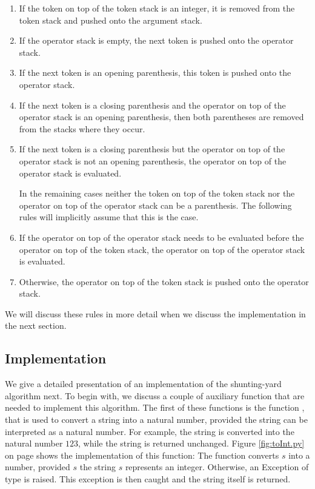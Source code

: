 \begin{enumerate}
\item If the token on top of the token stack is an integer, it is removed from the token stack and pushed onto
      the argument stack.
\item If the operator stack is empty, the next token is pushed onto the operator stack.
\item If the next token is an opening parenthesis, this token is pushed onto the operator stack.
\item If the next token is a closing parenthesis and the operator on top of the operator stack is an opening
      parenthesis, then both parentheses are removed from the stacks where they occur.
\item If the next token is a closing parenthesis but the operator on top of the operator stack is not an
      opening parenthesis,  the operator on top of the operator stack is evaluated.
 
      In the remaining cases neither the token on top of the token stack nor the operator on top of the
      operator stack can be a parenthesis.  The following rules will implicitly assume that this is the case.
\item If the operator on top of the operator stack needs to be evaluated before the operator on top of the token stack,
      the operator on top of the operator stack is evaluated.
\item Otherwise, the operator on top of the token stack is pushed onto the operator stack.
\end{enumerate}
We will discuss these rules in more detail when we discuss the implementation in the next section.


\subsection{Implementation}
We give a detailed presentation of an implementation of the shunting-yard algorithm next.  To begin with, we
discuss a couple of auxiliary 
function that are needed to implement this algorithm.  The first of these functions is the function
, that is used to convert a string into a natural number, provided the string can be interpreted as a
natural number.  For example, the string  is converted into the natural number $123$, while the
string  is returned unchanged.  Figure \ref{fig:toInt.py} on page \pageref{fig:toInt.py} shows the
implementation of this function:  The function  converts $s$ into a number, provided $s$ the string
$s$ represents an integer.  Otherwise, an Exception of type  is raised.  This exception is
then caught and the string itself is returned.


